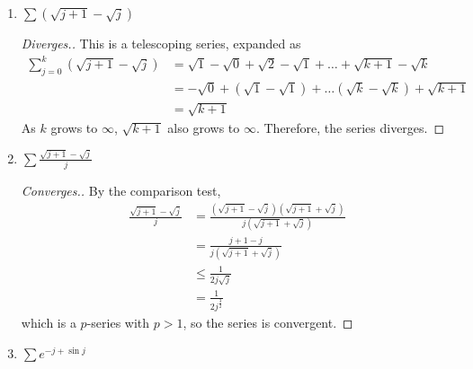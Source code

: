 \documentclass{article}
\begin{document}
\begin{enumerate}
\begin{enumerate}
\begin{proof}[Converges.]
\begin{align*}
                                    \therefore\limsup\frac{a_{j+1}}{a_j} & < 1
                              \end{align*}
                        \end{proof}
                  \item $\sum(\sqrt{j+1}-\sqrt{j})$
                        \begin{proof}[Diverges.]
                              This is a telescoping series, expanded as
                              \begin{align*}
                                    \sum_{j=0}^k(\sqrt{j+1}-\sqrt{j}) & = \sqrt{1}-\sqrt{0}+\sqrt{2}-\sqrt{1}+\ldots+\sqrt{k+1}-\sqrt{k}     \\
                                                                      & = -\sqrt{0}+(\sqrt{1}-\sqrt{1})+\ldots(\sqrt{k}-\sqrt{k})+\sqrt{k+1} \\
                                                                      & = \sqrt{k+1}
                              \end{align*}
                              As $k$ grows to $\infty$, $\sqrt{k+1}$ also grows to $\infty$.
                              Therefore, the series diverges.
                        \end{proof}
                  \item $\sum\frac{\sqrt{j+1}-\sqrt{j}}{j}$
                        \begin{proof}[Converges.]
                              By the comparison test,
                              \begin{align*}
                                    \frac{\sqrt{j+1}-\sqrt{j}}{j} & = \frac{(\sqrt{j+1}-\sqrt{j})(\sqrt{j+1}+\sqrt{j})}{j(\sqrt{j+1}+\sqrt{j})} \\
                                                                  & = \frac{j+1-j}{j(\sqrt{j+1}+\sqrt{j})}                                      \\
                                                                  & \leq \frac{1}{2j\sqrt{j}}                                                   \\
                                                                  & = \frac{1}{2j^{\frac{3}{2}}}
                              \end{align*}
                              which is a $p$-series with $p>1$, so the series is convergent.
                        \end{proof}
                  \item $\sum e^{-j+\sin j}$

\end{enumerate}
\end{enumerate}
\end{document}
